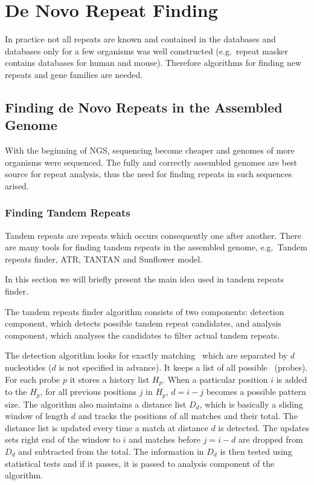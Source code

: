 \section{De Novo Repeat Finding}

In practice not all repeats are known and contained in the databases and databases only for a few organisms was well constructed (e.g.\ repeat masker contains databases for human and mouse\cite{repeatmasker}). Therefore algorithms for finding new repeats and gene families are needed.

\subsection{Finding de Novo Repeats in the Assembled Genome}

With the beginning of NGS, sequencing become cheaper and genomes of more organisms were sequenced. The fully and correctly assembled genomes are best source for repeat analysis, thus the need for finding repeats in such sequences arised.

\subsubsection{Finding Tandem Repeats}
Tandem repeats are repeats which occurs consequently one after another. There are many tools for finding tandem repeats in the assembled genome, e.g.\ Tandem repeats finder\cite{trf}, ATR\cite{atr}, TANTAN\cite{tantan} and Sunflower model\cite{nanasi2014probabilistic}.

In this section we will briefly present the main idea used in tandem repeats finder.

The tandem repeats finder algorithm consists of two components: detection component, which detects possible tandem repeat candidates, and analysis component, which analyses the candidates to filter actual tandem repeats.

The detection algorithm looks for exactly matching \kmers\ which are separated by $d$ nucleotides ($d$ is not specified in advance). It keeps a list of all possible \kmers\ (probes).
For each probe $p$ it stores a history list $H_p$.
When a particular position $i$ is added to the $H_p$, for all previous positions $j$ in $H_p$, $d = i - j$ becomes a possible pattern size.
The algorithm also maintains a distance list $D_d$, which is basically a sliding window of length $d$ and tracks the positions of all matches and their total. The distance list is updated every time a match at distance $d$ is detected. The updates sets right end of the window to $i$ and matches before $j = i - d$ are dropped from $D_d$ and subtracted from the total. The information in $D_d$ is then tested using statistical tests and if it passes, it is passed to analysis component of the algorithm.

